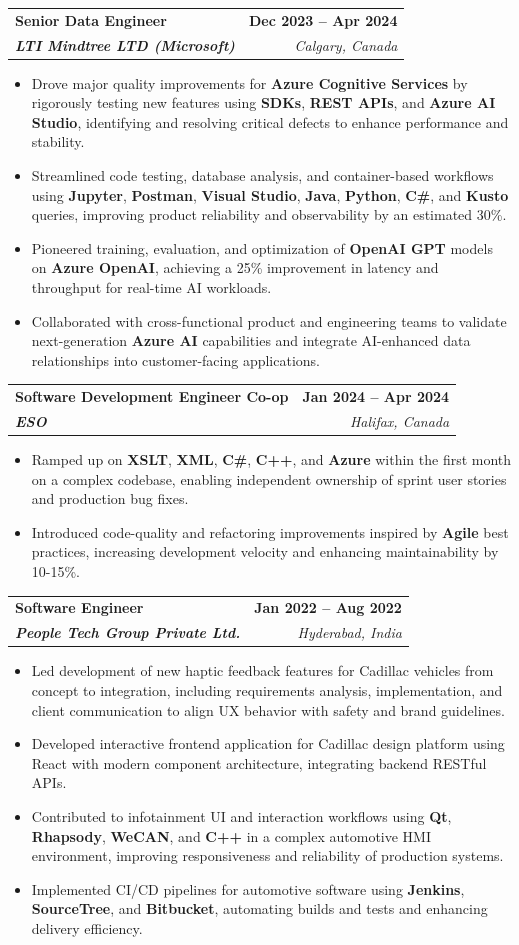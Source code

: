 \documentclass[letterpaper,11pt]{article}
\makeatletter
\newcommand{\resumeItem}[1]{
  \item\small{
    {#1 \vspace{-2pt}}
  }
}
\newcommand{\resumeSubheading}[4]{
  \vspace{-2pt}\item
    \begin{tabular*}{1.0\textwidth}[t]{l@{\extracolsep{\fill}}r}
      \textbf{#1} & \textbf{\small #2} \\
      \textit{\small#3} & \textit{\small #4} \\
    \end{tabular*}\vspace{-7pt}
}
\newcommand{\resumeItemListStart}{\begin{itemize}}
\newcommand{\resumeItemListEnd}{\end{itemize}\vspace{-5pt}}
\makeatother
\begin{document}
    \resumeSubheading
      {\textbf{Senior Data Engineer}}{\textbf{Dec 2023 -- Apr 2024}}
      {\textbf{LTI Mindtree LTD (Microsoft)}}{Calgary, Canada}
      \resumeItemListStart
        \resumeItem{Drove major quality improvements for \textbf{Azure Cognitive Services} by rigorously testing new features using \textbf{SDKs}, \textbf{REST APIs}, and \textbf{Azure AI Studio}, identifying and resolving critical defects to enhance performance and stability.}
        \resumeItem{Streamlined code testing, database analysis, and container-based workflows using \textbf{Jupyter}, \textbf{Postman}, \textbf{Visual Studio}, \textbf{Java}, \textbf{Python}, \textbf{C\#}, and \textbf{Kusto} queries, improving product reliability and observability by an estimated 30\%.}
        \resumeItem{Pioneered training, evaluation, and optimization of \textbf{OpenAI GPT} models on \textbf{Azure OpenAI}, achieving a 25\% improvement in latency and throughput for real-time AI workloads.}
        \resumeItem{Collaborated with cross-functional product and engineering teams to validate next-generation \textbf{Azure AI} capabilities and integrate AI-enhanced data relationships into customer-facing applications.}
      \resumeItemListEnd
    
    \resumeSubheading
      {\textbf{Software Development Engineer Co-op}}{\textbf{Jan 2024 -- Apr 2024}}
      {\textbf{ESO}}{Halifax, Canada}
      \resumeItemListStart
        \resumeItem{Ramped up on \textbf{XSLT}, \textbf{XML}, \textbf{C\#}, \textbf{C++}, and \textbf{Azure} within the first month on a complex codebase, enabling independent ownership of sprint user stories and production bug fixes.}
        \resumeItem{Introduced code-quality and refactoring improvements inspired by \textbf{Agile} best practices, increasing development velocity and enhancing maintainability by 10-15\%.}
      \resumeItemListEnd

    \resumeSubheading
      {\textbf{Software Engineer}}{\textbf{Jan 2022 -- Aug 2022}}
      {\textbf{People Tech Group Private Ltd.}}{Hyderabad, India}
      \resumeItemListStart
        \resumeItem{Led development of new haptic feedback features for Cadillac vehicles from concept to integration, including requirements analysis, implementation, and client communication to align UX behavior with safety and brand guidelines.}
        \resumeItem{Developed interactive frontend application for Cadillac design platform using React with modern component architecture, integrating backend RESTful APIs.}
        \resumeItem{Contributed to infotainment UI and interaction workflows using \textbf{Qt}, \textbf{Rhapsody}, \textbf{WeCAN}, and \textbf{C++} in a complex automotive HMI environment, improving responsiveness and reliability of production systems.}
        \resumeItem{Implemented CI/CD pipelines for automotive software using \textbf{Jenkins}, \textbf{SourceTree}, and \textbf{Bitbucket}, automating builds and tests and enhancing delivery efficiency.}
      \resumeItemListEnd
\end{document}
